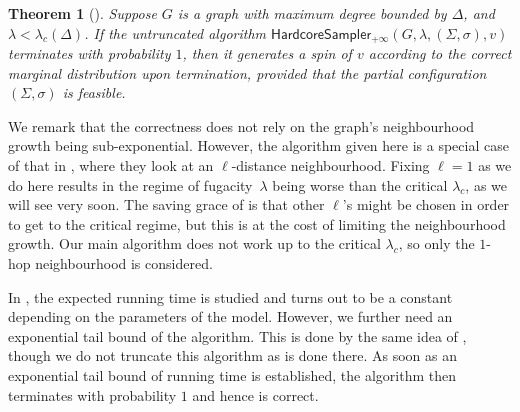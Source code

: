 \documentclass[10pt,a4paper]{article}
\newtheorem{theorem}{Theorem}[section]
\newtheorem{corollary}{Corollary}[section]
\renewcommand{\Pr}{\mathop{\mathrm{Pr}}\nolimits}
\newcommand{\hcsampler}{\mathsf{HardcoreSampler}}
\newcommand{\dTV}{d_{\mathrm{TV}}}
\begin{document}
\begin{theorem}[{\cite[Theorem 5.3]{AJ22}}]
Suppose $G$ is a graph with maximum degree bounded by $\Delta$, and $\lambda<\lambda_c(\Delta)$. 
If the untruncated algorithm $\hcsampler{}_{+\infty}(G,\lambda,(\Sigma,\sigma),v)$ terminates with probability $1$, then it generates a spin of $v$ according to the correct marginal distribution upon termination, provided that the partial configuration $(\Sigma,\sigma)$ is feasible. 
\end{theorem}

We remark that the correctness does not rely on the graph's neighbourhood growth being sub-exponential. 
However, the algorithm given here is a special case of that in \cite{AJ22}, where they look at an $\ell$-distance neighbourhood. 
Fixing $\ell=1$ as we do here results in the regime of fugacity~$\lambda$ being worse than the critical $\lambda_c$, as we will see very soon. 
The saving grace of \cite{AJ22} is that other $\ell$'s might be chosen in order to get to the critical regime, but this is at the cost of limiting the neighbourhood growth. 
Our main algorithm does not work up to the critical $\lambda_c$, so only the $1$-hop neighbourhood is considered. 



In \cite{AJ22}, the expected running time is studied and turns out to be a constant depending on the parameters of the model. 
However, we further need an exponential tail bound of the algorithm. 
This is done by the same idea of \cite[Section B.3]{FGWWY22}, 
though we do not truncate this algorithm as is done there. 
As soon as an exponential tail bound of running time is established, the algorithm then terminates with probability $1$ and hence is correct. 
\end{document}
